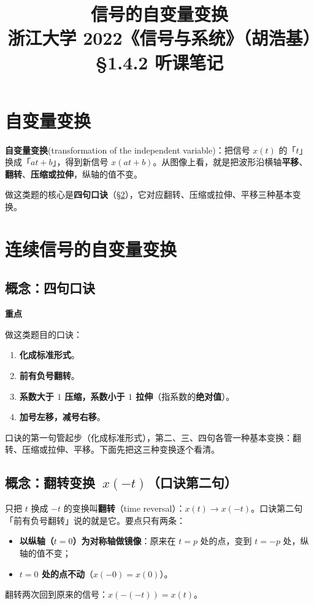 \documentclass[UTF8,a4paper,11pt]{ctexart}
\title{信号的自变量变换\\\large 浙江大学 2022《信号与系统》（胡浩基）§1.4.2 听课笔记}
\author{}
\date{}
\newenvironment{remember}{\begin{rememberbox}\textbf{重点}\par\smallskip}{\end{rememberbox}}
\newcounter{ex}[section]
\begin{document}
\pagestyle{plain}
\maketitle

\section{自变量变换}
\textbf{自变量变换}(transformation of the independent variable)：把信号 $x(t)$ 的「$t$」换成「$at+b$」，得到新信号 $x(at+b)$。从图像上看，就是把波形沿横轴\textbf{平移}、\textbf{翻转}、\textbf{压缩或拉伸}，纵轴的值不变。

做这类题的核心是\textbf{四句口诀}（\S\ref{sec:cont}），它对应翻转、压缩或拉伸、平移三种基本变换。

\section{连续信号的自变量变换}\label{sec:cont}

\subsection{概念：四句口诀}
\begin{remember}
做这类题目的口诀：
\begin{enumerate}[nosep]
\item \textbf{化成标准形式}。
\item \textbf{前有负号翻转}。
\item \textbf{系数大于 $1$ 压缩，系数小于 $1$ 拉伸}（指系数的\textbf{绝对值}）。
\item \textbf{加号左移，减号右移}。
\end{enumerate}
\end{remember}

口诀的第一句管起步（化成标准形式），第二、三、四句各管一种基本变换：翻转、压缩或拉伸、平移。下面先把这三种变换逐个看清。

\subsection{\texorpdfstring{概念：翻转变换~$x(-t)$（口诀第二句）}{概念：翻转变换 x(-t)（口诀第二句）}}

只把 $t$ 换成 $-t$ 的变换叫\textbf{翻转}（time reversal）：$x(t)\to x(-t)$。口诀第二句「前有负号翻转」说的就是它。要点只有两条：
\begin{itemize}[nosep]
\item \textbf{以纵轴（$t=0$）为对称轴做镜像}：原来在 $t=p$ 处的点，变到 $t=-p$ 处，纵轴的值不变；
\item \textbf{$t=0$ 处的点不动}（$x(-0)=x(0)$）。
\end{itemize}
翻转两次回到原来的信号：$x(-(-t))=x(t)$。
\end{document}
